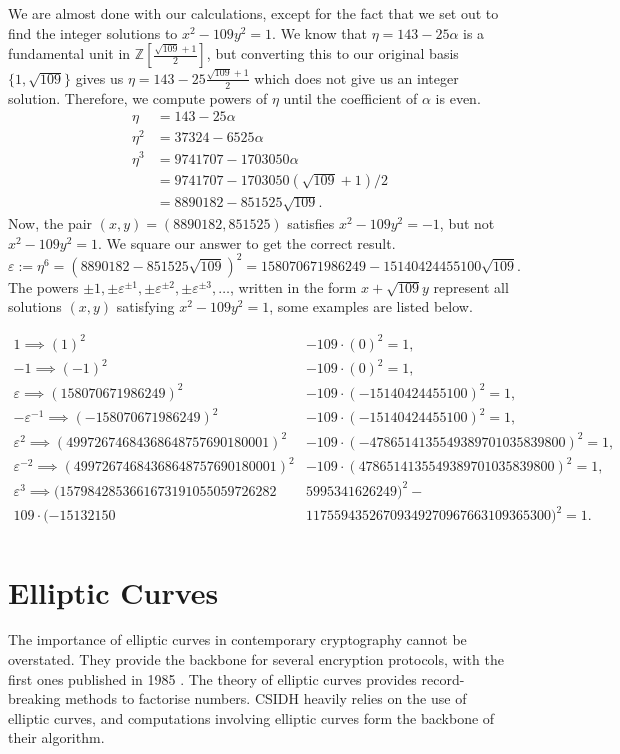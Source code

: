 \documentclass[openany, a4paper, 10pt]{book}
\theoremstyle{plain}
\theoremstyle{plain}
\theoremstyle{plain}
\theoremstyle{definition}
\theoremstyle{plain}
\theoremstyle{definition}
\theoremstyle{remark}
\begin{document}
We are almost done with our calculations, except for the fact that we set out to find the integer solutions to $x^2-109y^2 = 1$.
We know that $\eta = 143-25 \alpha$ is a fundamental unit in $\mathbb Z[\frac{\sqrt{109}+1}{2}]$, but converting this to our original basis $\{ 1, \sqrt{109} \}$ gives us
$\eta = 143 - 25\frac{\sqrt{109}+1}{2}$ which does not give us an integer solution.
Therefore, we compute powers of $\eta$ until the coefficient of $\alpha$ is even.
\begin{align*}
    \eta &= 143 - 25 \alpha \\
    \eta^2 &= 37324 - 6525 \alpha \\
    \eta^3 &= 9741707 - 1703050 \alpha \\
           &= 9741707 - 1703050 (\sqrt{109}+1)/2 \\
           &= 8890182 - 851525 \sqrt{109}.
\end{align*}
Now, the pair $(x,y) = (8890182, 851525)$ satisfies $x^2-109y^2 = -1$, but not $x^2-109y^2=1$.
We square our answer to get the correct result.
$$\varepsilon := \eta^6 = (8890182 - 851525 \sqrt{109}) ^ 2 = 158070671986249 - 15140424455100\sqrt{109}.$$
The powers $\pm1, \pm\varepsilon^{\pm1}, \pm\varepsilon^{\pm2}, \pm\varepsilon^{\pm3}, \dots$, written in the form $x+\sqrt{109}y$ represent all solutions $(x,y)$ satisfying
$x^2-109y^2 = 1$, some examples are listed below.

\begin{align*}
    1 \implies (1)^2&-109\cdot (0)^2 = 1,\\
    -1 \implies (-1)^2&-109\cdot (0)^2 = 1,\\
    \varepsilon \implies (158070671986249)^2&-109\cdot (-15140424455100)^2 = 1,\\
    -\varepsilon^{-1} \implies (-158070671986249)^2&-109\cdot (-15140424455100)^2 = 1,\\
    \varepsilon^2 \implies (49972674684368648757690180001)^2&-109\cdot (-4786514135549389701035839800)^2 = 1, \\
    \varepsilon^{-2} \implies (49972674684368648757690180001)^2&-109\cdot (4786514135549389701035839800)^2 = 1, \\
    \varepsilon^3 \implies (1579842853661673191055059726282&5995341626249)^2-\\
    109\cdot (-15132150&11755943526709349270967663109365300)^2 = 1.\\
\end{align*}


\chapter{Elliptic Curves}\label{chap:curves}
The importance of elliptic curves in contemporary cryptography cannot be overstated.
They provide the backbone for several encryption protocols, with the first ones published in 1985 \cite{miller} \cite{koblitz}.
The theory of elliptic curves provides record-breaking methods to factorise numbers.
CSIDH heavily relies on the use of elliptic curves, and computations involving elliptic curves form the backbone of their algorithm.
\end{document}
